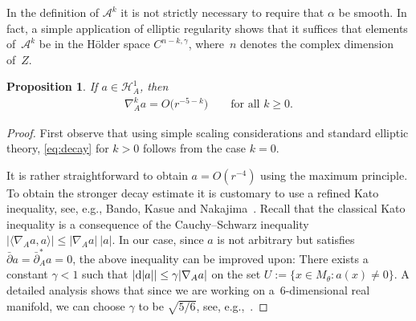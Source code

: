 \documentclass[10pt,a4paper]{amsart}
\numberwithin{equation}{section}
\newcommand{\rd}{{\rm d}}
\newcommand{\cA}{\mathcal{A}}
\newcommand{\cH}{\mathcal{H}}
\newcommand{\delbar}{\bar \del}
\newcommand{\del}{\partial}
\newtheorem{Proposition}[Theorem]{Proposition}
 { \theoremstyle{definition}
\newtheorem{Definition}[Theorem]{Definition}
\newtheorem{Remark}[Theorem]{Remark} }
\begin{document}
\begin{Remark}
  In the def\/inition of $\cA^k$ it is not strictly necessary to require
  that $\alpha$ be smooth.  In fact, a simple application of elliptic
  regularity shows that it suf\/f\/ices that elements of~$\cA^k$ be in
  the H\"older space $C^{n-k,\gamma}$, where~$n$ denotes the complex
  dimension of~$Z$.
\end{Remark}

\begin{Proposition}\label{prop:decay}
  If $a\in\cH^1_A$, then
  \begin{gather}\label{eq:decay}
    \nabla_A^k a=O\big(r^{-5-k}\big) \qquad \text{for all $k\geq 0$.}
  \end{gather}
\end{Proposition}

\begin{proof}
  First observe that using simple scaling considerations and standard
  elliptic theory, \eqref{eq:decay} for $k>0$ follows from the case
  $k=0$.

  It is rather straightforward to obtain $a=O(r^{-4})$ using the
  maximum principle.  To obtain the stronger decay estimate it is
  customary to use a ref\/ined Kato inequality, see, e.g., Bando, Kasue
  and Nakajima~\cite{Bando1989}.  Recall that the classical Kato
  inequality is a consequence of the Cauchy--Schwarz inequality
  $|\langle \nabla_A a,a\rangle |\leq |\nabla_A a|\ |a|$.  In our case, since $a$ is not arbitrary but satisf\/ies $\delbar a = \delbar_A^* a=0$, the above inequality can be improved upon:
  There exists a constant $\gamma<1$ such that $|\rd|a||\leq \gamma|\nabla_A a|$ on
  the set $U:=\{x \in M_{\theta}\colon a(x) \neq 0\}$.  A detailed
  analysis shows that since we are working on a~$6$-dimensional real
  manifold, we can choose $\gamma$ to be $\sqrt{5/6}$, see, e.g.,~\cite{Calderbank2000}.


\end{proof}
\end{document}
